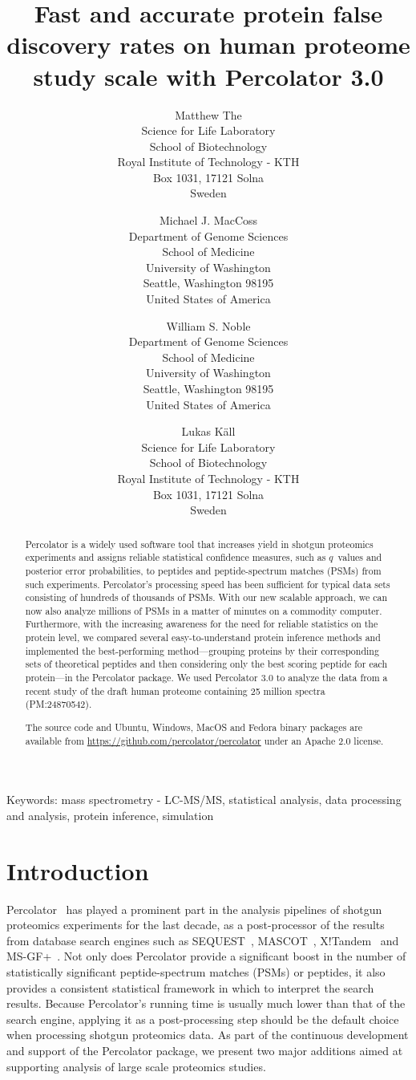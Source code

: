 \documentclass{article}
\title{Fast and accurate protein false discovery rates on human
proteome study scale with Percolator 3.0}
\author{Matthew The\\
Science for Life Laboratory\\
School of Biotechnology\\
Royal Institute of Technology - KTH\\
Box 1031, 17121 Solna\\ Sweden
\and 
Michael J. MacCoss\\
Department of Genome Sciences\\
School of Medicine\\
University of Washington\\
Seattle, Washington 98195\\
United States of America
\and 
William S. Noble\\
Department of Genome Sciences\\
School of Medicine\\
University of Washington\\
Seattle, Washington 98195\\
United States of America
\and
Lukas K\"{a}ll\\
Science for Life Laboratory\\
School of Biotechnology\\
Royal Institute of Technology - KTH\\ 
Box 1031, 17121 Solna\\ Sweden}
\begin{document}
\maketitle

\doublespacing

Keywords: mass spectrometry - LC-MS/MS, statistical analysis, 
data processing and analysis, protein inference, simulation


\newpage

\begin{abstract} 

Percolator is a widely used software tool that increases yield in
shotgun proteomics experiments and assigns reliable statistical
confidence measures, such as $q$~values and posterior error
probabilities, to peptides and peptide-spectrum matches (PSMs) from
such experiments. Percolator's processing speed has been sufficient
for typical data sets consisting of hundreds of thousands of
PSMs. With our new scalable approach, we can now also analyze millions
of PSMs in a matter of minutes on a commodity computer.  Furthermore,
with the increasing awareness for the need for reliable statistics on
the protein level, we compared several easy-to-understand protein
inference methods and implemented the best-performing
method---grouping proteins by their corresponding sets of theoretical
peptides and then considering only the best scoring peptide for each
protein---in the Percolator package. We used Percolator 3.0 to analyze
the data from a recent study of the draft human proteome containing 25
million spectra (PM:24870542).

The source code and Ubuntu, Windows, MacOS and Fedora binary packages
are available from \url{https://github.com/percolator/percolator}
under an Apache 2.0 license.
\end{abstract}

\newpage

\section*{Introduction}

Percolator~\cite{kall2007} has played a prominent part in the analysis
pipelines of shotgun proteomics experiments for the last decade, as a
post-processor of the results from database search engines such as
SEQUEST~\cite{eng1994}, MASCOT~\cite{cottrell1999},
X!Tandem~\cite{craig2004tandem} and MS-GF+~\cite{kim2008}. Not only
does Percolator provide a significant boost in the number of
statistically significant peptide-spectrum matches (PSMs) or peptides,
it also provides a consistent statistical framework in which to
interpret the search results. Because Percolator's running time is
usually much lower than that of the search engine, applying it as a
post-processing step should be the default choice when processing
shotgun proteomics data. As part of the continuous development and
support of the Percolator package, we present two major additions
aimed at supporting analysis of large scale proteomics studies.
\end{document}
